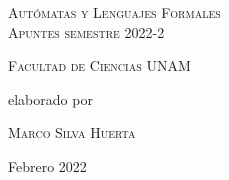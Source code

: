 \documentclass[letterpaper,12pt,titlepage]{article}
\begin{document}
\begin{titlepage}

    \vspace{.9cm}
    \begin{center}
        {\scshape \mytitle Autómatas y Lenguajes Formales}\\
        \vspace{2.5cm}
        {\scshape \mytitle Apuntes semestre 2022-2}    
    \end{center}
	\vspace{.6cm}
	{\scshape \Large \mysecond Facultad de Ciencias UNAM\par }
    \vfill
	\small{elaborado por\par}
        \vspace{.1cm}
	{\scshape \myautor Marco Silva Huerta\par}
        \vspace{1cm}
	{\Large \mydate Febrero 2022 \par}
	
\end{titlepage}

\newpage
    
\newpage
    
\newpage
    

    
\end{document}
